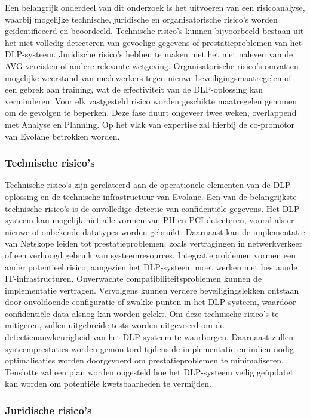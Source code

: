 Een belangrijk onderdeel van dit onderzoek is het uitvoeren van een risicoanalyse, waarbij mogelijke technische, juridische en organisatorische risico's worden geïdentificeerd en beoordeeld.
Technische risico's kunnen bijvoorbeeld bestaan uit het niet volledig detecteren van gevoelige gegevens of prestatieproblemen van het DLP-systeem. 
Juridische risico's hebben te maken met het niet naleven van de AVG-vereisten of andere relevante wetgeving. 
Organisatorische risico's omvatten mogelijke weerstand van medewerkers tegen nie\-uwe beveiligingsmaatregelen of een gebrek aan training, 
wat de effectiviteit van de DLP-oplossing kan verminderen.
Voor elk vastgesteld risico worden geschikte maatregelen genomen om de gevolgen te beperken.
Deze fase duurt ongeveer twee weken, overlappend met Analyse en Planning. Op het vlak van expertise zal hierbij de co-promotor van Evolane betrokken worden.

\subsubsection{Technische risico's}

Technische risico's zijn gerelateerd aan de operationele elementen van de DLP-oplossing en de technische infrastructuur van Evolane.
Een van de belangrijkste technische risico's is de onvolledige detectie van confidentiële gegevens. 
Het DLP-systeem kan mogelijk niet alle vormen van PII en PCI detecteren, vooral als er nieuwe of onbekende datatypes worden gebruikt.
Daarnaast kan de implementatie van Netskope leiden tot prestatieproblemen, zoals vertragingen in netwerkverkeer of een verhoogd gebruik van systeemresources.
Integratieproblemen vormen een ander potentieel risico, aangezien het DLP-systeem moet werken met bestaande IT-infrastructuren.
Onverwachte compatibiliteitsproblemen kunnen de implementatie vertragen. Vervolgens kunnen verdere beveiligingslekken ontstaan 
door onvoldoende configuratie of zwakke punten in het DLP-systeem, waardoor confidentiële data alsnog kan worden gelekt.
Om deze technische risico's te mitigeren, zullen uitgebreide tests worden uitgevoerd om de detectienauwkeurigheid van het DLP-systeem te waarborgen.
Daarnaast zullen systeemprestaties worden gemonitord tijdens de implementatie en indien nodig optimalisaties worden doorgevoerd om prestatieproblemen te minimaliseren.
Tenslotte zal een plan worden opgesteld hoe het DLP-systeem veilig geüpdatet kan worden om potentiële kwetsbaarheden te vermijden.

\subsubsection{Juridische risico's}

